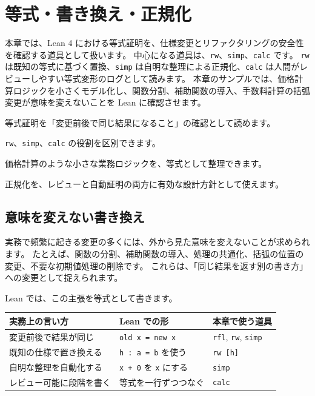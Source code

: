 \chapter{等式・書き換え・正規化}
\label{chap:ch18_equations_rewriting_normalization}

\begin{chapterabstract}
本章では、Lean 4 における等式証明を、仕様変更とリファクタリングの安全性を確認する道具として扱います。
中心になる道具は、\texttt{rw}、\texttt{simp}、\texttt{calc} です。
\texttt{rw} は既知の等式に基づく置換、\texttt{simp} は自明な整理による正規化、\texttt{calc} は人間がレビューしやすい等式変形のログとして読みます。
本章のサンプルでは、価格計算ロジックを小さくモデル化し、関数分割、補助関数の導入、手数料計算の括弧変更が意味を変えないことを Lean に確認させます。
\end{chapterabstract}

\begin{learninggoals}
\item 等式証明を「変更前後で同じ結果になること」の確認として読めます。
\item \texttt{rw}、\texttt{simp}、\texttt{calc} の役割を区別できます。
\item 価格計算のような小さな業務ロジックを、等式として整理できます。
\item 正規化を、レビューと自動証明の両方に有効な設計方針として使えます。
\end{learninggoals}

\section{意味を変えない書き換え}

実務で頻繁に起きる変更の多くには、外から見た意味を変えないことが求められます。
たとえば、関数の分割、補助関数の導入、処理の共通化、括弧の位置の変更、不要な初期値処理の削除です。
これらは、「同じ結果を返す別の書き方」への変更として捉えられます。

Lean では、この主張を等式として書きます。

\begin{center}
\begin{tabular}{lll}
\toprule
実務上の言い方 & Lean での形 & 本章で使う道具 \\
\midrule
変更前後で結果が同じ & \texttt{old x = new x} & \texttt{rfl}, \texttt{rw}, \texttt{simp} \\
既知の仕様で置き換える & \texttt{h : a = b} を使う & \texttt{rw [h]} \\
自明な整理を自動化する & \texttt{x + 0} を \texttt{x} にする & \texttt{simp} \\
レビュー可能に段階を書く & 等式を一行ずつつなぐ & \texttt{calc} \\
\bottomrule
\end{tabular}
\end{center}

